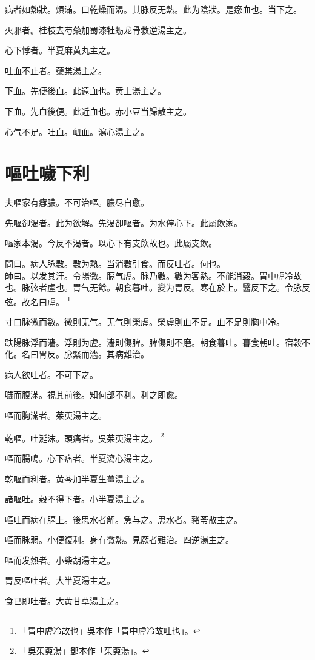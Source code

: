 \documentclass[b5paper,twoside,zihao=-4,UTF8]{ctexbook}
\begin{document}
病者如熱狀。煩滿。口乾燥而渴。其脉反无熱。此为陰狀。是瘀血也。当下之。

火邪者。桂枝去芍藥加蜀漆牡蛎龙骨救逆湯主之。

心下悸者。半夏麻黄丸主之。

吐血不止者。蘗枼湯主之。

下血。先便後血。此遠血也。黄土湯主之。

下血。先血後便。此近血也。赤小豆当歸散主之。

心气不足。吐血。衄血。瀉心湯主之。

\chapter{嘔吐噦下利}

夫嘔家有癰膿。不可治嘔。膿尽自愈。

先嘔卻渴者。此为欲解。先渴卻嘔者。为水停心下。此屬飲家。

嘔家本渴。今反不渴者。以心下有支飲故也。此屬支飲。

問曰。病人脉數。數为熱。当消數引食。而反吐者。何也。\\
師曰。以发其汗。令陽微。膈气虗。脉乃數。數为客熱。不能消穀。胃中虗冷故也。脉弦者虗也。胃气无餘。朝食暮吐。變为胃反。寒在於上。醫反下之。令脉反弦。故名曰虗。
	\footnote{「胃中虗冷故也」吳本作「胃中虗冷故吐也」。}

寸口脉微而數。微則无气。无气則榮虗。榮虗則血不足。血不足則胸中冷。

趺陽脉浮而濇。浮則为虗。濇則傷脾。脾傷則不磨。朝食暮吐。暮食朝吐。宿穀不化。名曰胃反。脉緊而濇。其病難治。

病人欲吐者。不可下之。

噦而腹滿。視其前後。知何部不利。利之即愈。

嘔而胸滿者。茱萸湯主之。

乾嘔。吐涎沫。頭痛者。吳茱萸湯主之。
	\footnote{「吳茱萸湯」鄧本作「茱萸湯」。}

嘔而腸鳴。心下痞者。半夏瀉心湯主之。

乾嘔而利者。黄芩加半夏生薑湯主之。

諸嘔吐。穀不得下者。小半夏湯主之。

嘔吐而病在膈上。後思水者解。急与之。思水者。豬苓散主之。

嘔而脉弱。小便復利。身有微熱。見厥者難治。四逆湯主之。

嘔而发熱者。小柴胡湯主之。

胃反嘔吐者。大半夏湯主之。

食已即吐者。大黄甘草湯主之。
\end{document}
